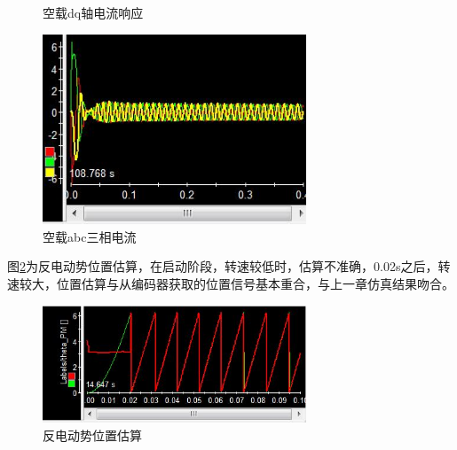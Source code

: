 \begin{figure} [H]
	\centering%
	\hspace{2em}%
	\caption{空载dq轴电流响应}\label{fig:dq_current}
\end{figure}
\begin{figure}[H]
	\centering
	\includegraphics[width=0.7\textwidth]{figs/three_phase_current.jpg}
	\caption{空载abc三相电流}
\end{figure}
图\ref{fig:estimation}为反电动势位置估算，在启动阶段，转速较低时，估算不准确，0.02s之后，转速较大，位置估算与从编码器获取的位置信号基本重合，与上一章仿真结果吻合。
\begin{figure}[H]
	\centering
	\includegraphics[width=0.7\textwidth]{figs/position_estimation.jpg}
	\caption{反电动势位置估算}
	\label{fig:estimation}
\end{figure}
